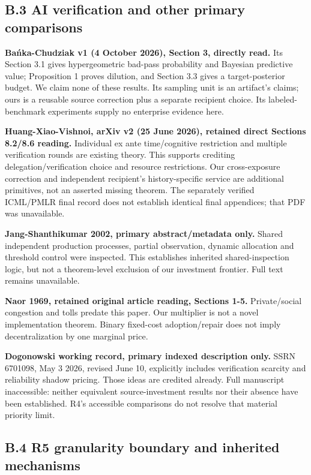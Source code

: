 \documentclass[
  11pt,
  a4paper,
]{article}
\begin{document}
\hypertarget{b.3-ai-verification-and-other-primary-comparisons}{%
\subsection{B.3 AI verification and other primary
comparisons}\label{b.3-ai-verification-and-other-primary-comparisons}}

\textbf{Bańka-Chudziak v1 (4 October 2026), Section 3, directly read.}
Its Section 3.1 gives hypergeometric bad-pass probability and Bayesian
predictive value; Proposition 1 proves dilution, and Section 3.3 gives a
target-posterior budget. We claim none of these results. Its sampling
unit is an artifact's claims; ours is a reusable source correction plus
a separate recipient choice. Its labeled-benchmark experiments supply no
enterprise evidence here.

\textbf{Huang-Xiao-Vishnoi, arXiv v2 (25 June 2026), retained direct
Sections 8.2/8.6 reading.} Individual ex ante time/cognitive restriction
and multiple verification rounds are existing theory. This supports
crediting delegation/verification choice and resource restrictions. Our
cross-exposure correction and independent recipient's history-specific
service are additional primitives, not an asserted missing theorem. The
separately verified ICML/PMLR final record does not establish identical
final appendices; that PDF was unavailable.

\textbf{Jang-Shanthikumar 2002, primary abstract/metadata only.} Shared
independent production processes, partial observation, dynamic
allocation and threshold control were inspected. This establishes
inherited shared-inspection logic, but not a theorem-level exclusion of
our investment frontier. Full text remains unavailable.

\textbf{Naor 1969, retained original article reading, Sections 1-5.}
Private/social congestion and tolls predate this paper. Our multiplier
is not a novel implementation theorem. Binary fixed-cost adoption/repair
does not imply decentralization by one marginal price.

\textbf{Dogonowski working record, primary indexed description only.}
SSRN 6701098, May 3 2026, revised June 10, explicitly includes
verification scarcity and reliability shadow pricing. Those ideas are
credited already. Full manuscript inaccessible: neither equivalent
source-investment results nor their absence have been established. R4's
accessible comparisons do not resolve that material priority limit.

\hypertarget{b.4-r5-granularity-boundary-and-inherited-mechanisms}{%
\subsection{B.4 R5 granularity boundary and inherited
mechanisms}\label{b.4-r5-granularity-boundary-and-inherited-mechanisms}}
\end{document}
